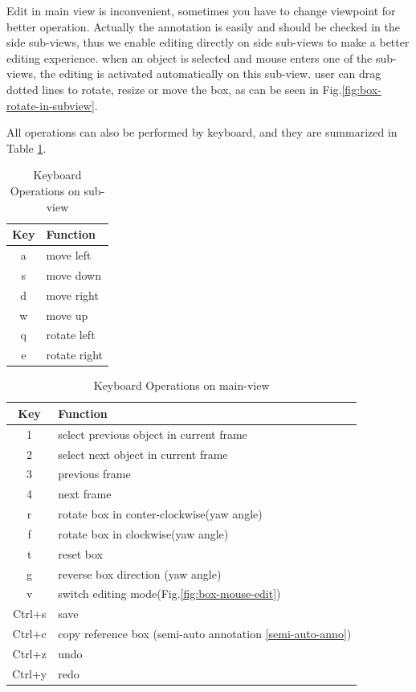 \documentclass[letterpaper, 10 pt, conference]{ieeeconf}  %
\begin{document}
Edit in main view is inconvenient, sometimes you have to change viewpoint for better operation. Actually the annotation is easily and should be checked in the side sub-views, thus we enable editing directly on side sub-views to make a better editing experience. when an object is selected and mouse enters one of the sub-views, the editing is activated automatically on this sub-view. user can drag dotted lines to rotate, resize or move the box, as can be seen in Fig.\ref{fig:box-rotate-in-subview}.

All operations can also be performed by keyboard, and they are summarized in Table \ref{table_keyboard_subview}.

\begin{table}[h]
	\caption{Keyboard Operations on sub-view}
	\label{table_keyboard_subview}
	\begin{center}
		\begin{tabular}{|c|l|}
			\hline
			\textbf{Key} & \textbf{Function}\\			
			\hline
			a & move left\\
			\hline
			s & move down\\
			\hline
			d & move right\\
			\hline
			w & move up\\
			\hline
			q & rotate left\\
			\hline
			e & rotate right\\
			\hline
		\end{tabular}
	\end{center}
\end{table}

\begin{table}[h]
	\caption{Keyboard Operations on main-view}
	\label{table_keyboard_mainview}
	\begin{center}
		\begin{tabular}{|c|l|}
			\hline
			\textbf{Key} & \textbf{Function}\\
			\hline
			1 & select previous object in current frame\\
			\hline
			2 & select next object in current frame\\
			\hline
			3 & previous frame\\
			\hline
			4 & next frame\\
			\hline
			r & rotate box in conter-clockwise(yaw angle)\\
			\hline
			f & rotate box in clockwise(yaw angle)\\
			\hline
			t & reset box\\
			\hline
			g & reverse box direction (yaw angle)\\
			\hline
			v & switch editing mode(Fig.\ref{fig:box-mouse-edit})\\
			\hline
			Ctrl+s & save\\
			\hline
			Ctrl+c & copy reference box (semi-auto annotation \ref{semi-auto-anno})\\
			\hline
			Ctrl+z & undo\\
			\hline
			Ctrl+y & redo\\
			\hline
		\end{tabular}
	\end{center}
\end{table}
\end{document}
